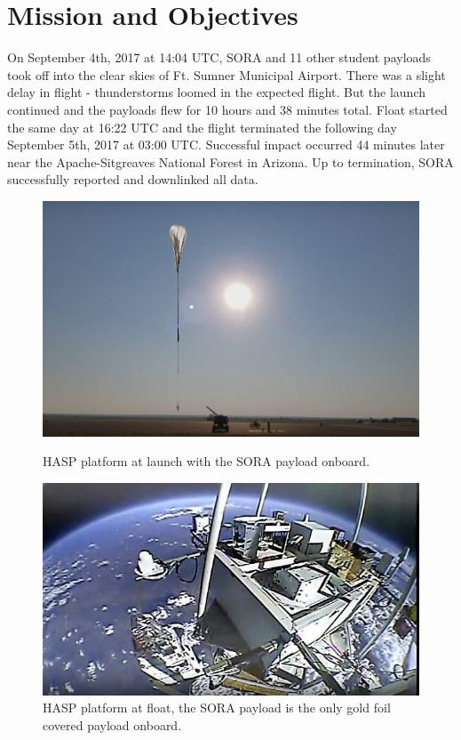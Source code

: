 \section{Mission and Objectives}
\label{sec:Introduction}
 
On September 4th, 2017 at 14:04 UTC, SORA and 11 other student payloads took off into the clear skies of Ft. Sumner Municipal Airport.  There was a slight delay in flight - thunderstorms loomed in the expected flight.  But the launch continued and the payloads flew for 10 hours and 38 minutes total.  Float started the same day at 16:22 UTC and the flight terminated the following day September 5th, 2017 at 03:00 UTC.  Successful impact occurred 44 minutes later near the Apache-Sitgreaves National Forest in Arizona.  Up to termination, SORA successfully reported and downlinked all data.

\begin{figure}[h!]
  \begin{center}
    \begin{minipage}[c]{0.45\linewidth}
      \includegraphics[width=\textwidth]{./Figures/sora_takeoff.jpg}
      \caption{HASP platform at launch with the SORA payload onboard.}
      \label{fig:takeoff}
    \end{minipage}
    \hfill
    \begin{minipage}[c]{0.49\linewidth}
      \includegraphics[width=\textwidth]{./Figures/sora_flight.jpg}
      \caption{HASP platform at float, the SORA payload is the only gold foil covered payload onboard.}
      \label{fig:float}
    \end{minipage}
  \end{center}
\end{figure}

